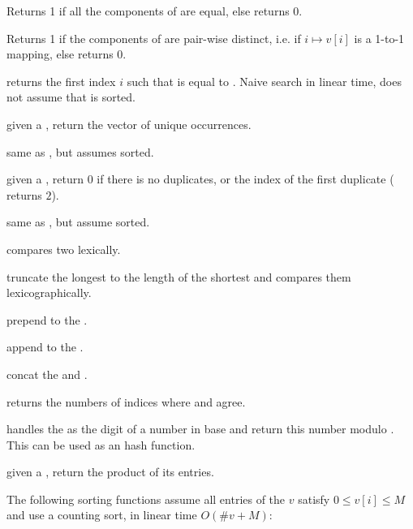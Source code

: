  Returns 1 if all the components of 
are equal, else returns 0.

  Returns 1 if the components of  are
pair-wise distinct, i.e. if $i\mapsto v[i]$ is a 1-to-1 mapping, else returns
0.

 returns the first index $i$
such that  is equal to . Naive search in linear time, does
not assume that  is sorted.

 given a  , return
the vector of unique occurrences.

 same as , but assumes
  sorted.

 given a  , return
$0$ if there is no duplicates, or the index of the first duplicate
( returns $2$).

 same as
, but assume  sorted.

 compares two  lexically.

 truncate the longest 
to the length of the shortest and compares them lexicographically.

 prepend  to the
 .

 append  to the
 .

 concat the  
and .

 returns the numbers of indices
where  and  agree.

 handles the
  as the digit of a number in base  and return
this number modulo . This can be used as an hash function.

 given a  , return
the product of its entries.

The following sorting functions assume all entries of the 
$v$ satisfy $0 \leq v[i] \leq M$ and use a counting sort, in linear time
$O(\#v + M)$:

